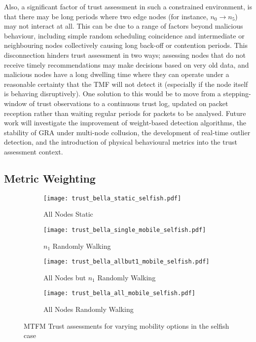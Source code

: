 Also, a significant factor of trust assessment in such a constrained environment, is that there may be long periods where two edge nodes (for instance, $n_0 \to n_5$) may not interact at all. 
This can be due to a range of factors beyond malicious behaviour, including simple random scheduling coincidence and intermediate or neighbouring nodes collectively causing long back-off or contention periods.
This disconnection hinders trust assessment in two ways; assessing nodes that do not receive timely recommendations may make decisions based on very old data, and malicious nodes have a long dwelling time where they can operate under a reasonable certainty that the TMF will not detect it (especially if the node itself is behaving disruptively).
One solution to this would be to move from a stepping-window of trust observations to a continuous trust log, updated on packet reception rather than waiting regular periods for packets to be analysed.
Future work will investigate the improvement of weight-based detection algorithms, the stability of GRA under multi-node collusion, the development of real-time outlier detection, and the introduction of physical behavioural metrics into the trust assessment context.



\subsection{Metric Weighting}
\begin{figure}
\begin{subfigure}{.5\textwidth}
  \centering
  \texttt{[image: trust\_bella\_static\_selfish.pdf]}
  \caption{All Nodes Static}
  \label{fig:selfish_trust_static}
\end{subfigure}%
\begin{subfigure}{.5\textwidth}
  \centering
  \texttt{[image: trust\_bella\_single\_mobile\_selfish.pdf]}
  \caption{$n_1$ Randomly Walking}
  \label{fig:selfish_trust_single}
\end{subfigure}
\begin{subfigure}{.5\textwidth}
\centering
  \texttt{[image: trust\_bella\_allbut1\_mobile\_selfish.pdf]}
  \caption{All Nodes but $n_1$ Randomly Walking}
  \label{fig:selfish_trust_allbut1}
\end{subfigure}
\begin{subfigure}{.5\textwidth}
\centering
  \texttt{[image: trust\_bella\_all\_mobile\_selfish.pdf]}
  \caption{All Nodes Randomly Walking}
  \label{fig:selfish_trust_all_mobile}
\end{subfigure}
\caption{MTFM Trust assessments for varying mobility options in the selfish case}
\label{fig:trust_mobility}
\end{figure}



